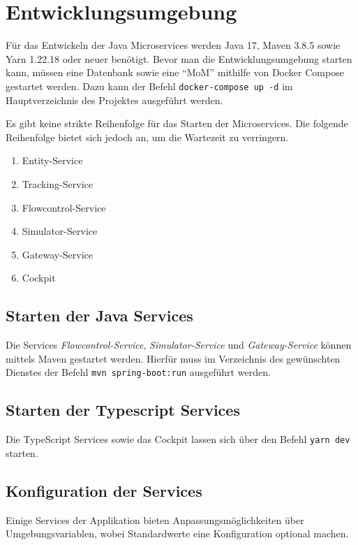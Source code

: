 \section{Entwicklungsumgebung}

Für das Entwickeln der Java Microservices werden Java 17, Maven 3.8.5 sowie Yarn 1.22.18 oder neuer benötigt.
Bevor man die Entwicklungsumgebung starten kann, müssen eine Datenbank sowie eine \enquote{MoM} mithilfe von Docker Compose gestartet werden.
Dazu kann der Befehl \verb|docker-compose up -d| im Hauptverzeichnis des Projektes ausgeführt werden.

Es gibt keine strikte Reihenfolge für das Starten der Microservices.
Die folgende Reihenfolge bietet sich jedoch an, um die Wartezeit zu verringern. 

\begin{enumerate}
	\item Entity-Service
	\item Tracking-Service
	\item Flowcontrol-Service
	\item Simulator-Service
	\item Gateway-Service
	\item Cockpit
\end{enumerate}

\subsection{Starten der Java Services}

Die Services \textit{Flowcontrol-Service}, \textit{Simulator-Service} und \textit{Gateway-Service} können mittels Maven gestartet werden.
Hierfür muss im Verzeichnis des gewünschten Dienstes der Befehl \verb|mvn spring-boot:run| ausgeführt werden.

\subsection{Starten der Typescript Services}

Die TypeScript Services sowie das Cockpit lassen sich über den Befehl \verb|yarn dev| starten.


\subsection{Konfiguration der Services}

Einige Services der Applikation bieten Anpassungsmöglichkeiten über Umgebungsvariablen, wobei Standardwerte eine Konfiguration optional machen.

